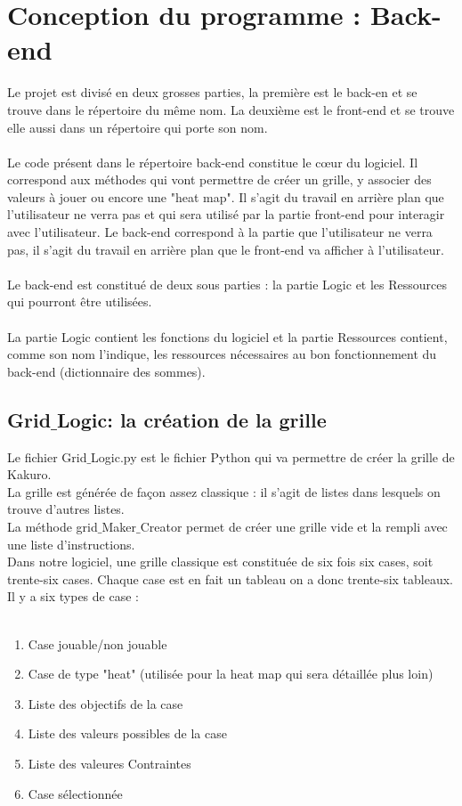 \documentclass[12pt]{article}
\begin{document}
\section{Conception du programme : Back-end}
Le projet est divisé en deux grosses parties, la première est le back-en et se trouve dans le répertoire du même nom. La deuxième est le front-end et se trouve elle aussi dans un répertoire qui porte son nom.
\\ \\
Le code présent dans le répertoire back-end constitue le cœur du logiciel. Il correspond aux méthodes qui vont permettre de créer un grille, y associer des valeurs à jouer ou  encore une "heat map". Il s'agit du travail en arrière plan que l'utilisateur ne verra pas et qui sera utilisé par la partie front-end pour interagir avec l'utilisateur.
Le back-end correspond à la partie que l'utilisateur ne verra pas, il s'agit du travail en arrière plan que le front-end va afficher à l'utilisateur. \\ \\ 
Le back-end est constitué de deux sous parties : la partie Logic et les Ressources qui pourront être utilisées. \\ \\
La partie Logic contient les fonctions du logiciel et la partie Ressources contient, comme son nom l'indique, les ressources nécessaires au bon fonctionnement du back-end (dictionnaire des sommes).

 

\subsection{Grid$\_$Logic: la création de la grille}
Le fichier Grid$\_$Logic.py est le fichier Python qui va permettre de créer la grille de Kakuro. \\ La grille est générée de façon assez classique : il s'agit de listes dans lesquels on trouve d'autres listes. \\
La méthode grid$\_$Maker$\_$Creator permet de créer une grille vide et la rempli avec une liste d'instructions. \\
Dans notre logiciel, une grille classique est constituée de six fois six cases, soit trente-six cases. Chaque case est en fait un tableau on a donc trente-six tableaux. \\
\newpage
Il y a six types de case : \\ \\
\begin{enumerate}
\item[] Case jouable/non jouable
\item[] Case de type "heat" (utilisée pour la heat map qui sera détaillée plus loin)
\item[] Liste des objectifs de la case
\item[] Liste des valeurs possibles de la case
\item[] Liste des valeures Contraintes
\item[] Case sélectionnée
\end{enumerate} 
\end{document}
